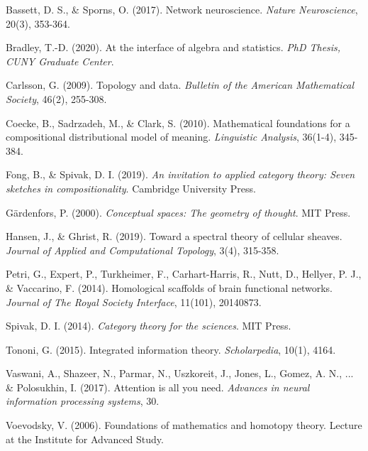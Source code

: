 \documentclass[11pt]{article}
\begin{document}

\begin{thebibliography}{99}

Bassett, D. S., \& Sporns, O. (2017).
Network neuroscience.
\emph{Nature Neuroscience}, 20(3), 353-364.

Bradley, T.-D. (2020).
At the interface of algebra and statistics.
\emph{PhD Thesis, CUNY Graduate Center}.

Carlsson, G. (2009).
Topology and data.
\emph{Bulletin of the American Mathematical Society}, 46(2), 255-308.

Coecke, B., Sadrzadeh, M., \& Clark, S. (2010).
Mathematical foundations for a compositional distributional model of meaning.
\emph{Linguistic Analysis}, 36(1-4), 345-384.

Fong, B., \& Spivak, D. I. (2019).
\emph{An invitation to applied category theory: Seven sketches in compositionality}.
Cambridge University Press.

Gärdenfors, P. (2000).
\emph{Conceptual spaces: The geometry of thought}.
MIT Press.

Hansen, J., \& Ghrist, R. (2019).
Toward a spectral theory of cellular sheaves.
\emph{Journal of Applied and Computational Topology}, 3(4), 315-358.

Petri, G., Expert, P., Turkheimer, F., Carhart-Harris, R., Nutt, D., Hellyer, P. J., \& Vaccarino, F. (2014).
Homological scaffolds of brain functional networks.
\emph{Journal of The Royal Society Interface}, 11(101), 20140873.

Spivak, D. I. (2014).
\emph{Category theory for the sciences}.
MIT Press.

Tononi, G. (2015).
Integrated information theory.
\emph{Scholarpedia}, 10(1), 4164.

Vaswani, A., Shazeer, N., Parmar, N., Uszkoreit, J., Jones, L., Gomez, A. N., ... \& Polosukhin, I. (2017).
Attention is all you need.
\emph{Advances in neural information processing systems}, 30.

Voevodsky, V. (2006).
Foundations of mathematics and homotopy theory.
Lecture at the Institute for Advanced Study.

\end{thebibliography}
\end{document}
